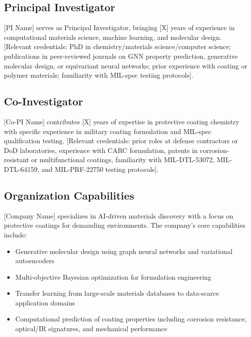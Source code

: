 \documentclass[11pt,letterpaper]{article}
\begin{document}
\subsection{Principal Investigator}

[PI Name] serves as Principal Investigator, bringing [X] years of experience in computational materials science, machine learning, and molecular design. [Relevant credentials: PhD in chemistry/materials science/computer science; publications in peer-reviewed journals on GNN property prediction, generative molecular design, or equivariant neural networks; prior experience with coating or polymer materials; familiarity with MIL-spec testing protocols].

\subsection{Co-Investigator}

[Co-PI Name] contributes [X] years of expertise in protective coating chemistry with specific experience in military coating formulation and MIL-spec qualification testing. [Relevant credentials: prior roles at defense contractors or DoD laboratories, experience with CARC formulation, patents in corrosion-resistant or multifunctional coatings, familiarity with MIL-DTL-53072, MIL-DTL-64159, and MIL-PRF-22750 testing protocols].

\subsection{Organization Capabilities}

[Company Name] specializes in AI-driven materials discovery with a focus on protective coatings for demanding environments. The company's core capabilities include:

\begin{itemize}[nosep]
  \item Generative molecular design using graph neural networks and variational autoencoders
  \item Multi-objective Bayesian optimization for formulation engineering
  \item Transfer learning from large-scale materials databases to data-scarce application domains
  \item Computational prediction of coating properties including corrosion resistance, optical/IR signatures, and mechanical performance
\end{itemize}
\end{document}
